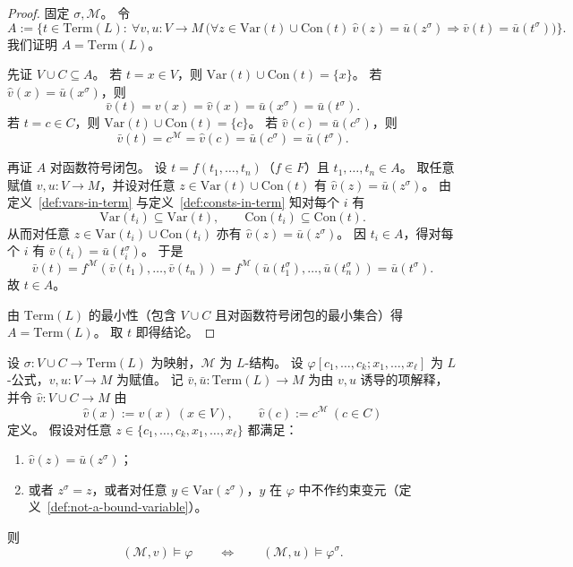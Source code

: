 \documentclass[lang=cn,a4paper,newtx,section]{elegantbook}
\begin{document}
 \begin{proof}
 固定 $\sigma,\mathcal M$。
 令
 \[
   A:=\bigl\{t\in\mathrm{Term}(L):\ \forall v,u:V\to M\,\bigl(\forall z\in\mathrm{Var}(t)\cup\mathrm{Con}(t)\ \hat v(z)=\bar u(z^{\sigma})\Rightarrow \bar v(t)=\bar u(t^{\sigma})\bigr)\bigr\}.
 \]
 我们证明 $A=\mathrm{Term}(L)$。

 先证 $V\cup C\subseteq A$。
 若 $t=x\in V$，则 $\mathrm{Var}(t)\cup\mathrm{Con}(t)=\{x\}$。
 若 $\hat v(x)=\bar u(x^{\sigma})$，则
 \[
   \bar v(t)=v(x)=\hat v(x)=\bar u(x^{\sigma})=\bar u(t^{\sigma}).
 \]
 若 $t=c\in C$，则 $\mathrm{Var}(t)\cup\mathrm{Con}(t)=\{c\}$。
 若 $\hat v(c)=\bar u(c^{\sigma})$，则
 \[
   \bar v(t)=c^{\mathcal M}=\hat v(c)=\bar u(c^{\sigma})=\bar u(t^{\sigma}).
 \]

 再证 $A$ 对函数符号闭包。
 设 $t=f(t_1,\dots,t_n)$（$f\in F$）且 $t_1,\dots,t_n\in A$。
 取任意赋值 $v,u:V\to M$，并设对任意 $z\in\mathrm{Var}(t)\cup\mathrm{Con}(t)$ 有 $\hat v(z)=\bar u(z^{\sigma})$。
 由定义~\ref{def:vars-in-term} 与定义~\ref{def:consts-in-term} 知对每个 $i$ 有
 \[
   \mathrm{Var}(t_i)\subseteq\mathrm{Var}(t),\qquad \mathrm{Con}(t_i)\subseteq\mathrm{Con}(t).
 \]
 从而对任意 $z\in\mathrm{Var}(t_i)\cup\mathrm{Con}(t_i)$ 亦有 $\hat v(z)=\bar u(z^{\sigma})$。
 因 $t_i\in A$，得对每个 $i$ 有 $\bar v(t_i)=\bar u(t_i^{\sigma})$。
 于是
 \[
   \bar v(t)=f^{\mathcal M}(\bar v(t_1),\dots,\bar v(t_n))=f^{\mathcal M}(\bar u(t_1^{\sigma}),\dots,\bar u(t_n^{\sigma}))=\bar u(t^{\sigma}).
 \]
 故 $t\in A$。

 由 $\mathrm{Term}(L)$ 的最小性（包含 $V\cup C$ 且对函数符号闭包的最小集合）得 $A=\mathrm{Term}(L)$。
 取 $t$ 即得结论。
 \end{proof}

 \begin{theorem}[替换定理]
 \label{substitution-theorem}
 设 $\sigma:V\cup C\to\mathrm{Term}(L)$ 为映射，$\mathcal M$ 为 $L$-结构。
 设 $\varphi[c_1,\dots,c_k; x_1,\dots,x_{\ell}]$ 为 $L$-公式，$v,u:V\to M$ 为赋值。
 记 $\bar v,\bar u:\mathrm{Term}(L)\to M$ 为由 $v,u$ 诱导的项解释，并令 $\hat v:V\cup C\to M$ 由
 \[
   \hat v(x):=v(x)\ (x\in V),\qquad \hat v(c):=c^{\mathcal M}\ (c\in C)
 \]
 定义。
 假设对任意 $z\in\{c_1,\dots,c_k,x_1,\dots,x_{\ell}\}$ 都满足：
 \begin{enumerate}
   \item $\hat v(z)=\bar u(z^{\sigma})$；
   \item 或者 $z^{\sigma}=z$，或者对任意 $y\in\mathrm{Var}(z^{\sigma})$，$y$ 在 $\varphi$ 中不作约束变元（定义~\ref{def:not-a-bound-variable}）。
 \end{enumerate}
 则
 \[
   (\mathcal M,v)\models\varphi\qquad\Longleftrightarrow\qquad(\mathcal M,u)\models\varphi^{\sigma}.
 \]
 \end{theorem}
\end{document}
